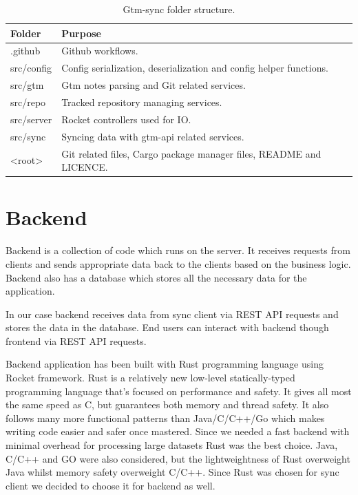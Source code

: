 \begin{table}[h]
    \centering
    \begin{tabular}{ | p{3cm} | p{10cm} |}
        \hline
        Folder & Purpose\\
        \hline
        .github & Github workflows.\\
        \hline
        src/config & Config serialization, deserialization and config helper functions.\\
        \hline
        src/gtm & Gtm notes parsing and Git related services.\\
        \hline
        src/repo & Tracked repository managing services.\\
        \hline
        src/server & Rocket controllers used for IO.\\
        \hline
        src/sync & Syncing data with gtm-api related services.\\
        \hline
        <root> & Git related files, Cargo package manager files, README and LICENCE.\\
        \hline
    \end{tabular}
    \caption{Gtm-sync folder structure.}
    \label{tab:gtm-sync-folder-structure}
\end{table}

\section{Backend}\label{sec:backend}
Backend is a collection of code which runs on the server.
It receives requests from clients and sends appropriate data back to the clients based on the business logic.
Backend also has a database which stores all the necessary data for the application.

In our case backend receives data from sync client via REST API requests and stores the data in the database.
End users can interact with backend though frontend via REST API requests.

Backend application has been built with Rust programming language using Rocket framework.
Rust is a relatively new low-level statically-typed programming language that's focused on performance and safety.
It gives all most the same speed as C, but guarantees both memory and thread safety.
It also follows many more functional patterns than Java/C/C++/Go which makes writing code easier and safer once mastered.
Since we needed a fast backend with minimal overhead for processing large datasets Rust was the best choice.
Java, C/C++ and GO were also considered, but the lightweightness of Rust overweight Java whilst memory safety overweight C/C++.
Since Rust was chosen for sync client we decided to choose it for backend as well.

